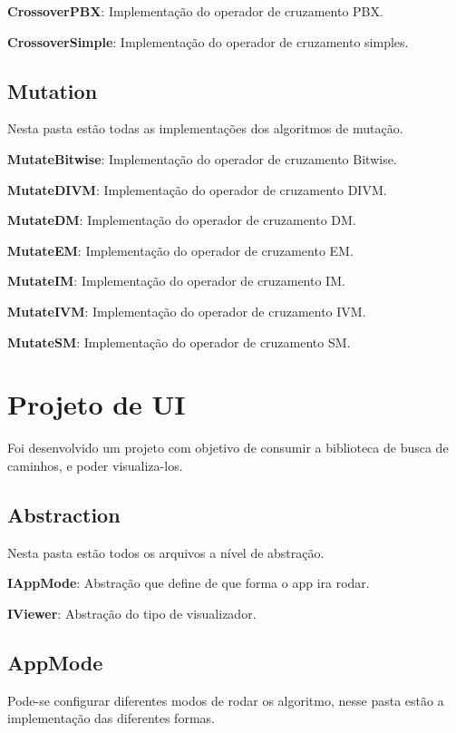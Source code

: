  \textbf{CrossoverPBX}: Implementação do operador de cruzamento PBX.
 
 \textbf{CrossoverSimple}:  Implementação do operador de cruzamento simples.
 
 \subsection{Mutation}
 
 Nesta pasta estão todas as implementações dos algoritmos de mutação.
 
 \textbf{MutateBitwise}: Implementação do operador de cruzamento Bitwise.
 
 \textbf{MutateDIVM}: Implementação do operador de cruzamento DIVM.
 
 \textbf{MutateDM}: Implementação do operador de cruzamento DM.
 
 \textbf{MutateEM}: Implementação do operador de cruzamento EM.
 
 \textbf{MutateIM}: Implementação do operador de cruzamento IM.
 
 \textbf{MutateIVM}: Implementação do operador de cruzamento IVM.
 
 \textbf{MutateSM}: Implementação do operador de cruzamento SM.
 
 
 \section{Projeto de UI}
 
 Foi desenvolvido um projeto com objetivo de consumir a biblioteca de busca de caminhos, e poder visualiza-los.
 
 \subsection{Abstraction}
 
 Nesta pasta estão todos os arquivos a nível de abstração.
 
 \textbf{IAppMode}: Abstração que define de que forma o app ira rodar.
 
 \textbf{IViewer}: Abstração do tipo de visualizador.
 
 \subsection{AppMode}
 
 Pode-se configurar diferentes modos de rodar os algoritmo, nesse pasta estão a implementação das diferentes formas.
 
